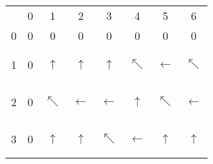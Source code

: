 \begin{figure}[!h]
{\begin{tabular}{cccccccc}
                       & 0                      & 1                      & 2                      & 3                      & 4                      & 5                      & 6                      \\ \cline{2-8}
\multicolumn{1}{c|}{0} & \multicolumn{1}{c|}{0} & \multicolumn{1}{c|}{0} & \multicolumn{1}{c|}{0} & \multicolumn{1}{c|}{0} & \multicolumn{1}{c|}{0} & \multicolumn{1}{c|}{0} & \multicolumn{1}{c|}{0} \\ \cline{2-8}
\multicolumn{1}{c|}{1} & \multicolumn{1}{c|}{0} & \multicolumn{1}{c|}{\begin{tiny}$\uparrow$\end{tiny}} & \multicolumn{1}{c|}{\begin{tiny}$\uparrow$\end{tiny}} & \multicolumn{1}{c|}{\begin{tiny}$\uparrow$\end{tiny}} & \multicolumn{1}{c|}{\begin{tiny}$\nwarrow$\end{tiny}} & \multicolumn{1}{c|}{\begin{tiny}$\leftarrow$\end{tiny}} & \multicolumn{1}{c|}{\begin{tiny}$\nwarrow$\end{tiny}} \\ \cline{2-8}
\multicolumn{1}{c|}{2} & \multicolumn{1}{c|}{0} & \multicolumn{1}{c|}{\begin{tiny}$\nwarrow$\end{tiny}} & \multicolumn{1}{c|}{\begin{tiny}$\leftarrow$\end{tiny}} & \multicolumn{1}{c|}{\begin{tiny}$\leftarrow$\end{tiny}} & \multicolumn{1}{c|}{\begin{tiny}$\uparrow$\end{tiny}} & \multicolumn{1}{c|}{\begin{tiny}$\nwarrow$\end{tiny}} & \multicolumn{1}{c|}{\begin{tiny}$\leftarrow$\end{tiny}} \\ \cline{2-8}
\multicolumn{1}{c|}{3} & \multicolumn{1}{c|}{0} & \multicolumn{1}{c|}{\begin{tiny}$\uparrow$\end{tiny}} & \multicolumn{1}{c|}{\begin{tiny}$\uparrow$\end{tiny}} & \multicolumn{1}{c|}{\begin{tiny}$\nwarrow$\end{tiny}} & \multicolumn{1}{c|}{\begin{tiny}$\leftarrow$\end{tiny}} & \multicolumn{1}{c|}{\begin{tiny}$\uparrow$\end{tiny}} & \multicolumn{1}{c|}{\begin{tiny}$\uparrow$\end{tiny}} \\ \cline{2-8}

\end{tabular}}
\end{figure}
